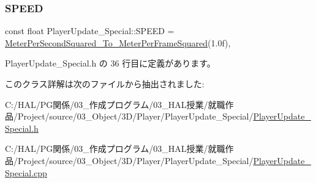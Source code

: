 \mbox{\label{class_player_update___special_a483e5e5a21d22c31c90194eb4e05e26f}} 
\subsubsection{\texorpdfstring{S\+P\+E\+ED}{SPEED}}
{\footnotesize\ttfamily const float Player\+Update\+\_\+\+Special\+::\+S\+P\+E\+ED = \mbox{\hyperlink{_meter_to_frame_8h_a3a2c155748ceb2eab2a3c303ae48ecc0}{Meter\+Per\+Second\+Squared\+\_\+\+To\+\_\+\+Meter\+Per\+Frame\+Squared}}(1.\+0f)\hspace{0.3cm}{\ttfamily [static]}, {\ttfamily [private]}}



 Player\+Update\+\_\+\+Special.\+h の 36 行目に定義があります。



このクラス詳解は次のファイルから抽出されました\+:\begin{DoxyCompactItemize}
\item 
C\+:/\+H\+A\+L/\+P\+G関係/03\+\_\+作成プログラム/03\+\_\+\+H\+A\+L授業/就職作品/\+Project/source/03\+\_\+\+Object/3\+D/\+Player/\+Player\+Update\+\_\+\+Special/\mbox{\hyperlink{_player_update___special_8h}{Player\+Update\+\_\+\+Special.\+h}}\item 
C\+:/\+H\+A\+L/\+P\+G関係/03\+\_\+作成プログラム/03\+\_\+\+H\+A\+L授業/就職作品/\+Project/source/03\+\_\+\+Object/3\+D/\+Player/\+Player\+Update\+\_\+\+Special/\mbox{\hyperlink{_player_update___special_8cpp}{Player\+Update\+\_\+\+Special.\+cpp}}\end{DoxyCompactItemize}
